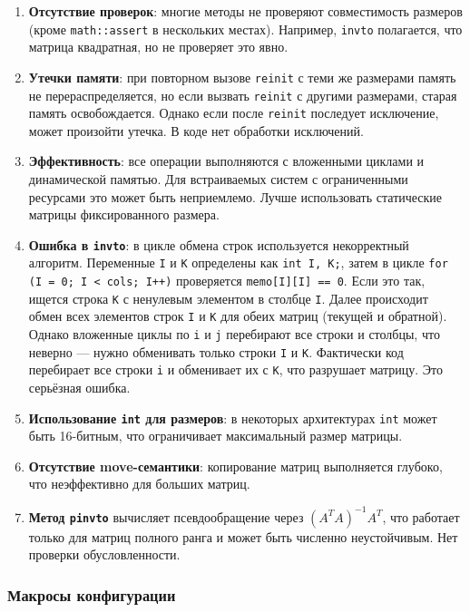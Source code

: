 \documentclass[a4paper,12pt]{article}
\begin{document}
\begin{enumerate}
    \item \textbf{Отсутствие проверок}: многие методы не проверяют совместимость размеров (кроме \texttt{math::assert} в нескольких местах). Например, \texttt{invto} полагается, что матрица квадратная, но не проверяет это явно.
    \item \textbf{Утечки памяти}: при повторном вызове \texttt{reinit} с теми же размерами память не перераспределяется, но если вызвать \texttt{reinit} с другими размерами, старая память освобождается. Однако если после \texttt{reinit} последует исключение, может произойти утечка. В коде нет обработки исключений.
    \item \textbf{Эффективность}: все операции выполняются с вложенными циклами и динамической памятью. Для встраиваемых систем с ограниченными ресурсами это может быть неприемлемо. Лучше использовать статические матрицы фиксированного размера.
    \item \textbf{Ошибка в \texttt{invto}}: в цикле обмена строк используется некорректный алгоритм. Переменные \texttt{I} и \texttt{K} определены как \texttt{int I, K;}, затем в цикле \texttt{for (I = 0; I < cols; I++)} проверяется \texttt{memo[I][I] == 0}. Если это так, ищется строка \texttt{K} с ненулевым элементом в столбце \texttt{I}. Далее происходит обмен всех элементов строк \texttt{I} и \texttt{K} для обеих матриц (текущей и обратной). Однако вложенные циклы по \texttt{i} и \texttt{j} перебирают все строки и столбцы, что неверно — нужно обменивать только строки \texttt{I} и \texttt{K}. Фактически код перебирает все строки \texttt{i} и обменивает их с \texttt{K}, что разрушает матрицу. Это серьёзная ошибка.
    \item \textbf{Использование \texttt{int} для размеров}: в некоторых архитектурах \texttt{int} может быть 16-битным, что ограничивает максимальный размер матрицы.
    \item \textbf{Отсутствие move-семантики}: копирование матриц выполняется глубоко, что неэффективно для больших матриц.
    \item \textbf{Метод \texttt{pinvto}} вычисляет псевдообращение через $(A^T A)^{-1} A^T$, что работает только для матриц полного ранга и может быть численно неустойчивым. Нет проверки обусловленности.
\end{enumerate}

\subsubsection{Макросы конфигурации}
\end{document}
